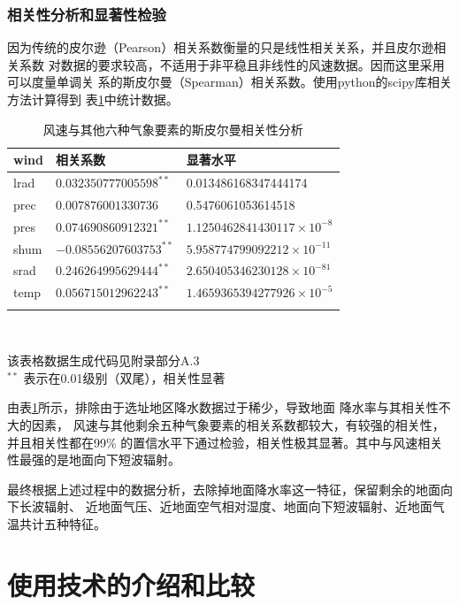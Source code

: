 \documentclass[AutoFakeBold]{LZUThesis}
\begin{document}
\subsection{相关性分析和显著性检验}
因为传统的皮尔逊（Pearson）相关系数衡量的只是线性相关关系，并且皮尔逊相关系数
对数据的要求较高，不适用于非平稳且非线性的风速数据。因而这里采用可以度量单调关
系的斯皮尔曼（Spearman）相关系数。使用python的scipy库相关方法计算得到
表\ref{relativity-analysis}中统计数据。

\begin{table}[H]
    \centering
    \caption{风速与其他六种气象要素的斯皮尔曼相关性分析}
    \begin{tabular}{lll}
    \toprule
    wind & 相关系数 & 显著水平 \\
    \midrule
    lrad & $0.032350777005598^{**}$ & 0.013486168347444174 \\
    prec & $0.007876001330736$ & 0.5476061053614518 \\
    pres & $0.074690860912321^{**}$ & $1.1250462841430117\times10^{-8}$ \\
    shum & $-0.08556207603753^{**}$ & $5.958774799092212\times10^{-11}$ \\
    srad & $0.246264995629444^{**}$ & $2.650405346230128\times10^{-81}$ \\
    temp & $0.056715012962243^{**}$ & $1.4659365394277926\times10^{-5}$ \\
    \bottomrule \\
    \end{tabular} \\
    \raggedright
    \footnotesize{该表格数据生成代码见附录部分A.3} \\
    \footnotesize{$^{**}$ 表示在0.01级别（双尾），相关性显著}
    \label{relativity-analysis}
\end{table}

由表\ref{relativity-analysis}所示，排除由于选址地区降水数据过于稀少，导致地面
降水率与其相关性不大的因素，
风速与其他剩余五种气象要素的相关系数都较大，有较强的相关性，并且相关性都在99\%
的置信水平下通过检验，相关性极其显著。其中与风速相关性最强的是地面向下短波辐射。

最终根据上述过程中的数据分析，去除掉地面降水率这一特征，保留剩余的地面向下长波辐射、
近地面气压、近地面空气相对湿度、地面向下短波辐射、近地面气温共计五种特征。


\chapter{使用技术的介绍和比较}
\end{document}
